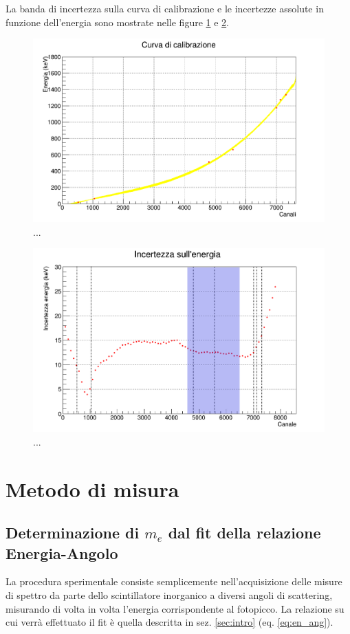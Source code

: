 \documentclass[8pt]{extarticle}
\begin{document}
La banda di incertezza sulla curva di calibrazione e le incertezze assolute in funzione dell'energia sono mostrate nelle figure \ref{fig:calib_en} e \ref{fig:err_en}.

\begin{figure}[h!] 
\includegraphics[width=\textwidth]{"calibrazione2"}
\caption{...}
\label{fig:calib_en}
\end{figure}

\begin{figure}[h!] 
\includegraphics[width=\textwidth]{"err_en4"}
\caption{...}
\label{fig:err_en}
\end{figure}


\section{Metodo di misura}
\subsection{Determinazione di $m_e$ dal fit della relazione Energia-Angolo}
La procedura sperimentale consiste semplicemente nell'acquisizione delle misure di spettro da parte dello scintillatore inorganico a diversi angoli di scattering, misurando di volta in volta l'energia corrispondente al fotopicco. La relazione su cui verrà effettuato il fit è quella descritta in sez. \ref{sec:intro} (eq. \ref{eq:en_ang}).
\end{document}
